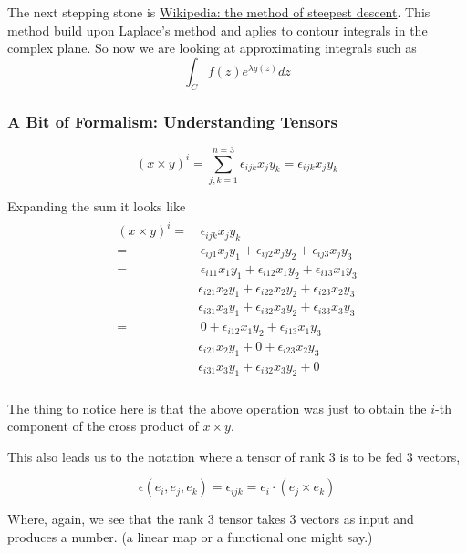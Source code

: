 The next stepping stone is
\href{https://en.wikipedia.org/wiki/Method_of_steepest_descent}{Wikipedia: the method of steepest descent}.
This method build upon Laplace's method and aplies to contour integrals in the complex plane.
So now we are looking at approximating integrals such as
$$
\int_{C} f(z) e^{\lambda g(z)} dz
$$


\subsubsection{A Bit of Formalism: Understanding Tensors}

$$
\left( x \times y \right)^i = \sum_{j,k=1}^{n=3} \epsilon_{ijk} x_j y_k = \epsilon_{ijk} x_j y_k
$$

Expanding the sum it looks like
\begin{align}
    \begin{split}
\left( x \times y \right)^i =& \, \epsilon_{ijk} x_j y_k \\
=& \, \epsilon_{ij1} x_j y_1 + \epsilon_{ij2} x_j y_2 + \epsilon_{ij3} x_j y_3 \\
=& \, \epsilon_{i11} x_1 y_1 + \epsilon_{i12} x_1 y_2 + \epsilon_{i13} x_1 y_3 \\
    & \epsilon_{i21} x_2 y_1 + \epsilon_{i22} x_2 y_2 + \epsilon_{i23} x_2 y_3 \\
    & \epsilon_{i31} x_3 y_1 + \epsilon_{i32} x_3 y_2 + \epsilon_{i33} x_3 y_3 \\
=& \, 0 + \epsilon_{i12} x_1 y_2 + \epsilon_{i13} x_1 y_3 \\
    & \epsilon_{i21} x_2 y_1 + 0 + \epsilon_{i23} x_2 y_3 \\
    & \epsilon_{i31} x_3 y_1 + \epsilon_{i32} x_3 y_2 + 0 \\
    \end{split}
\end{align} \label{tensors:levi-civita-component-i}

The thing to notice here is that the above operation was just to obtain the $i$-th component of the cross product
of $x \times y$.

This also leads us to the notation where a tensor of rank 3 is to be fed 3 vectors,

$$
\epsilon (e_i, e_j, e_k) = \epsilon_{ijk} = e_i \cdot (e_j \times e_k)
$$

Where, again, we see that the rank 3 tensor takes 3 vectors as input and produces a number.
(a linear map or a functional one might say.)

